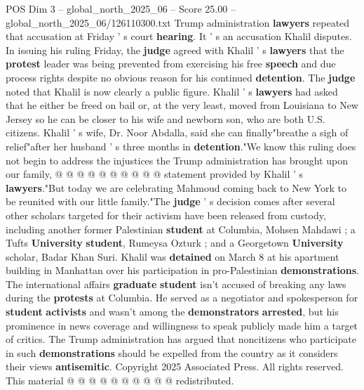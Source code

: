 \begin{textsample}{POS Dim 3 – global\_north\_2025\_06 – Score 25.00 – global\_north\_2025\_06/126110300.txt}
Trump administration \textbf{lawyers} repeated that accusation at Friday ' s court \textbf{hearing}.
It ' s an accusation Khalil disputes.
In issuing his ruling Friday, the \textbf{judge} agreed with Khalil ' s \textbf{lawyers} that the \textbf{protest} leader was being prevented from exercising his free \textbf{speech} and due process rights despite no obvious reason for his continued \textbf{detention}.
The \textbf{judge} noted that Khalil is now clearly a public figure.
Khalil ' s \textbf{lawyers} had asked that he either be freed on bail or, at the very least, moved from Louisiana to New Jersey so he can be closer to his wife and newborn son, who are both U.S. citizens.
Khalil ' s wife, Dr.
Noor Abdalla, said she can finally"breathe a sigh of relief"after her husband ' s three months in \textbf{detention}."We know this ruling does not begin to address the injustices the Trump administration has brought upon our family, @ @ @ @ @ @ @ @ @ @ statement provided by Khalil ' s \textbf{lawyers}."But today we are celebrating Mahmoud coming back to New York to be reunited with our little family."The \textbf{judge} ' s decision comes after several other scholars targeted for their activism have been released from custody, including another former Palestinian \textbf{student} at Columbia, Mohsen Mahdawi ; a Tufts \textbf{University} \textbf{student}, Rumeysa Ozturk ; and a Georgetown \textbf{University} scholar, Badar Khan Suri.
Khalil was \textbf{detained} on March 8 at his apartment building in Manhattan over his participation in pro-Palestinian \textbf{demonstrations}.
The international affairs \textbf{graduate} \textbf{student} isn't accused of breaking any laws during the \textbf{protests} at Columbia.
He served as a negotiator and spokesperson for \textbf{student} \textbf{activists} and wasn't among the \textbf{demonstrators} \textbf{arrested}, but his prominence in news coverage and willingness to speak publicly made him a target of critics.
The Trump administration has argued that noncitizens who participate in such \textbf{demonstrations} should be expelled from the country as it considers their views \textbf{antisemitic}.
Copyright 2025 Associated Press.
All rights reserved.
This material @ @ @ @ @ @ @ @ @ @ redistributed.

\end{textsample}
